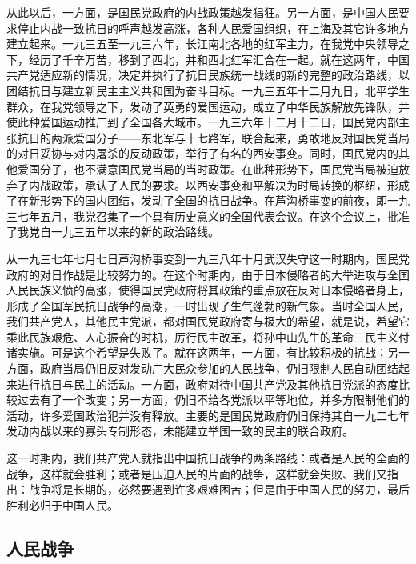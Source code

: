 从此以后，一方面，是国民党政府的内战政策越发猖狂。另一方面，是中国人民要求停止内战一致抗日的呼声越发高涨，各种人民爱国组织，在上海及其它许多地方建立起来。一九三五至一九三六年，长江南北各地的红军主力，在我党中央领导之下，经历了千辛万苦，移到了西北，并和西北红军汇合在一起。就在这两年，中国共产党适应新的情况，决定并执行了抗日民族统一战线的新的完整的政治路线，以团结抗日与建立新民主主义共和国为奋斗目标。一九三五年十二月九日，北平学生群众，在我党领导之下，发动了英勇的爱国运动，成立了中华民族解放先锋队，并使此种爱国运动推广到了全国各大城市。一九三六年十二月十二日，国民党内部主张抗日的两派爱国分子——东北军与十七路军，联合起来，勇敢地反对国民党当局的对日妥协与对内屠杀的反动政策，举行了有名的西安事变。同时，国民党内的其他爱国分子，也不满意国民党当局的当时政策。在此种形势下，国民党当局被迫放弃了内战政策，承认了人民的要求。以西安事变和平解决为时局转换的枢纽，形成了在新形势下的国内团结，发动了全国的抗日战争。在芦沟桥事变的前夜，即一九三七年五月，我党召集了一个具有历史意义的全国代表会议。在这个会议上，批准了我党自一九三五年以来的新的政治路线。

从一九三七年七月七日芦沟桥事变到一九三八年十月武汉失守这一时期内，国民党政府的对日作战是比较努力的。在这个时期内，由于日本侵略者的大举进攻与全国人民民族义愤的高涨，使得国民党政府将其政策的重点放在反对日本侵略者身上，形成了全国军民抗日战争的高潮，一时出现了生气蓬勃的新气象。当时全国人民，我们共产党人，其他民主党派，都对国民党政府寄与极大的希望，就是说，希望它乘此民族艰危、人心振奋的时机，厉行民主改革，将孙中山先生的革命三民主义付诸实施。可是这个希望是失败了。就在这两年，一方面，有比较积极的抗战；另一方面，政府当局仍旧反对发动广大民众参加的人民战争，仍旧限制人民自动团结起来进行抗日与民主的活动。一方面，政府对待中国共产党及其他抗日党派的态度比较过去有了一个改变；另一方面，仍旧不给各党派以平等地位，并多方限制他们的活动，许多爱国政治犯并没有释放。主要的是国民党政府仍旧保持其自一九二七年发动内战以来的寡头专制形态，未能建立举国一致的民主的联合政府。

这一时期内，我们共产党人就指出中国抗日战争的两条路线：或者是人民的全面的战争，这样就会胜利；或者是压迫人民的片面的战争，这样就会失败、我们又指出：战争将是长期的，必然要遇到许多艰难困苦；但是由于中国人民的努力，最后胜利必归于中国人民。

\subsection{人民战争}

